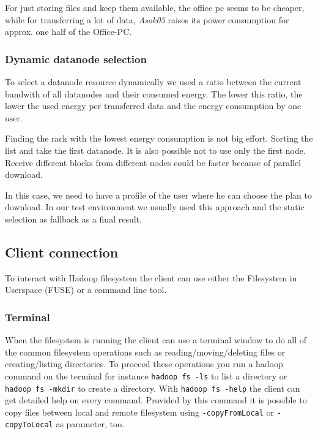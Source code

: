 For just storing files and keep them available, the office pc seems to be cheaper, while for transferring a lot of data, \textit{Asok05} raises its power consumption for approx. one half of the Office-PC.

\subsubsection{Dynamic datanode selection}

To select a datanode resource dynamically we used a ratio between the current bandwith of all datanodes and their consumed energy. The lower this ratio, the lower the used energy per transferred data and the energy consumption by one user.

Finding the rack with the lowest energy consumption is not big effort. Sorting the list and take the first datanode. It is also possible not to use only the first node. Receive different blocks from different nodes could be faster because of parallel download.

In this case, we need to have a profile of the user where he can choose the plan to download. In our test environment we usually used this approach and the static selection as fallback as a final result.

\subsection{Client connection}
\label{sec:hdfs_client}

To interact with Hadoop filesystem the client can use either the Filesystem in Userspace (FUSE) or a command line tool.

\subsubsection{Terminal}

When the filesystem is running the client can use a terminal window to do all of the common filesystem operations such as reading/moving/deleting files or creating/listing directories. To proceed these operations you run a hadoop command on the terminal for instance \texttt{hadoop fs -ls} to list a directory or \texttt{hadoop fs -mkdir} to create a directory. With \texttt{hadoop fs -help} the client can get detailed help on every command. 
Provided by this command it is possible to copy files between local and remote filesystem using \texttt{-copyFromLocal} or \texttt{-copyToLocal} as parameter, too.

